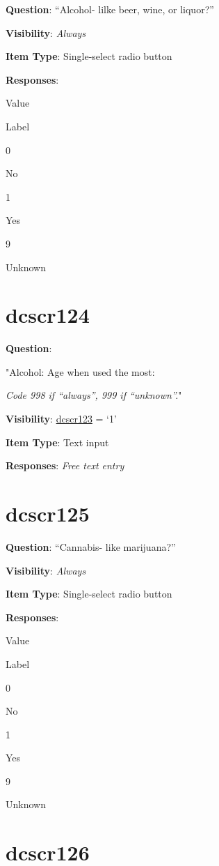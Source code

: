 \documentclass[]{book}
\begin{document}
\textbf{Question}: ``Alcohol- lilke beer, wine, or liquor?''

\textbf{Visibility}: \emph{Always}

\textbf{Item Type}: Single-select radio button

\textbf{Responses}:

Value

Label

0

No

1

Yes

9

Unknown

\hypertarget{dcscr124}{%
\section{dcscr124}\label{dcscr124}}

\textbf{Question}:

"Alcohol: Age when used the most:

\emph{Code 998 if ``always'', 999 if ``unknown''.}"

\textbf{Visibility}: \protect\hyperlink{dcscr123}{dcscr123} = `1'

\textbf{Item Type}: Text input

\textbf{Responses}: \emph{Free text entry}

\hypertarget{dcscr125}{%
\section{dcscr125}\label{dcscr125}}

\textbf{Question}: ``Cannabis- like marijuana?''

\textbf{Visibility}: \emph{Always}

\textbf{Item Type}: Single-select radio button

\textbf{Responses}:

Value

Label

0

No

1

Yes

9

Unknown

\hypertarget{dcscr126}{%
\section{dcscr126}\label{dcscr126}}
\end{document}
